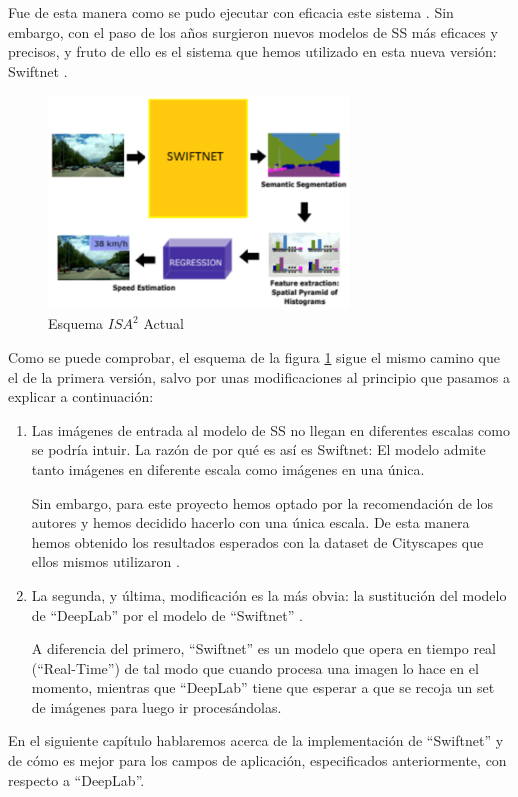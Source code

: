Fue de esta manera como se pudo ejecutar con eficacia este sistema \cite{isa2}. Sin embargo, con el paso de los años surgieron nuevos modelos de \ac{SS} más eficaces y precisos, y fruto de ello es el sistema que hemos utilizado en esta nueva versión: Swiftnet \cite{swiftnet}.


\begin{figure}[H]
  \centering
  \includegraphics[width=8cm]{Figuras/Figura_Esquema_ISA2_Version_2.eps}
  \caption{Esquema $ISA^{2}$ Actual}
    \label{fig:Isa_v2}
\end{figure}


Como se puede comprobar, el esquema de la figura \ref{fig:Isa_v2} sigue el mismo camino que el de la primera versión, salvo por unas modificaciones al principio que pasamos a explicar a continuación:

\begin{enumerate}

\item Las imágenes de entrada al modelo de \ac{SS} no llegan en diferentes escalas como se podría intuir. La razón de por qué es así es Swiftnet: El modelo admite tanto imágenes en diferente escala como imágenes en una única.


Sin embargo, para este proyecto hemos optado por la recomendación de los autores \cite{github_swiftnet} y hemos decidido hacerlo con una única escala. De esta manera hemos obtenido los resultados esperados con la dataset de Cityscapes \cite{cityscapes} que ellos mismos utilizaron \cite{swiftnet}.

\item La segunda, y última, modificación es la más obvia: la sustitución del modelo de ``DeepLab'' \cite{deeplab} por el modelo de ``Swiftnet'' \cite{swiftnet}.

A diferencia del primero, ``Swiftnet'' es un modelo que opera en tiempo real (``Real-Time'') de tal modo que cuando procesa una imagen lo hace en el momento, mientras que ``DeepLab'' tiene que esperar a que se recoja un set de imágenes para luego ir procesándolas.

\end{enumerate}


En el siguiente capítulo hablaremos acerca de la implementación de ``Swiftnet'' y de cómo es mejor para los campos de aplicación, especificados anteriormente, con respecto a ``DeepLab''.